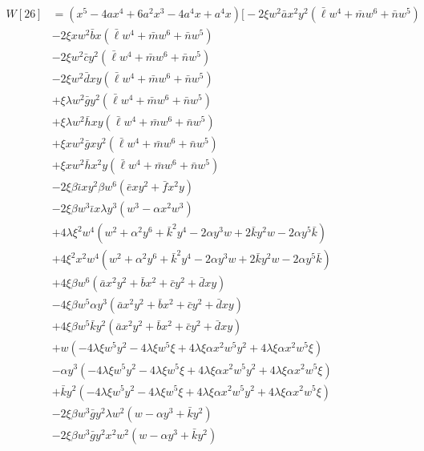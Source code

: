 \documentclass[12pt]{article}
\numberwithin{table}{section}
\begin{document}
\begin{align}
W[26] &= (x^5-4ax^4+6a^2x^3-4a^4x+a^4x)\biggl[-2\xi w^2\bar a x^2 y^2(\bar \ell  w^4 + \bar m  w^6 + \bar n  w^5) \\
&- 2\xi xw^2\bar b x(\bar \ell  w^4 + \bar m  w^6 + \bar n  w^5) \\
&- 2\xi w^2\bar c y^2 (\bar \ell  w^4 + \bar m  w^6 + \bar n  w^5)\\
&- 2\xi w^2\bar d xy (\bar \ell  w^4 + \bar m  w^6 + \bar n  w^5) \\
&+ \xi \lambda w^2\bar g y^2 (\bar \ell  w^4 + \bar m  w^6 + \bar n  w^5)\\
&+ \xi \lambda w^2\bar h x y(\bar \ell  w^4 + \bar m  w^6 + \bar n  w^5)\\
&+ \xi x w^2\bar g xy^2 (\bar \ell  w^4 + \bar m  w^6 + \bar n  w^5)
 \\
&+ \xi x w^2\bar h x^2 y(\bar \ell  w^4 + \bar m  w^6 + \bar n  w^5)\\
&-2\xi \beta \bar \iota x y^2\beta w^6 (\bar e xy^2 + \bar f x^2 y) \\
&- 2\xi \beta w^3 \bar \iota x \lambda y^3 (w^3 - \alpha x^2 w^3) \\
&+4\lambda\xi^2 w^4 (  w^2 + \alpha^2 y^6  + \bar k^2 y^4  - 2  \alpha y^3  w + 2 \bar k y^2 w - 2 \alpha y^5  \bar k) \\
&+4\xi^2 x^2w^4 (  w^2 + \alpha^2 y^6  + \bar k^2 y^4  - 2  \alpha y^3  w + 2 \bar k y^2 w - 2 \alpha y^5  \bar k)  \\
&+  4 \xi\beta w^6  (\bar a x^2 y^2 + \bar b x^2 + \bar c y^2 + \bar d xy ) \\
&- 4 \xi\beta w^5\alpha y^3 (\bar a x^2 y^2 + \bar b x^2 + \bar c y^2 + \bar d xy ) \\
&+ 4 \xi\beta w^5\bar k y^2 (\bar a x^2 y^2 + \bar b x^2 + \bar c y^2 + \bar d xy ) \\
&+  w (-4 \lambda \xi w^5 y^2  -4 \lambda \xi w^5 \xi  +4 \lambda \xi \alpha x^2 w^5 y^2  + 4 \lambda \xi \alpha x^2 w^5 \xi ) \\
&- \alpha y^3  (-4 \lambda \xi w^5 y^2  -4 \lambda \xi w^5 \xi  +4 \lambda \xi \alpha x^2 w^5 y^2  + 4 \lambda \xi \alpha x^2 w^5 \xi ) \\
&+ \bar k y^2  (-4 \lambda \xi w^5 y^2  -4 \lambda \xi w^5 \xi  +4 \lambda \xi \alpha x^2 w^5 y^2  + 4 \lambda \xi \alpha x^2 w^5 \xi ) \\
&-2 \xi\beta w^3 \bar g y^2\lambda w^2 (  w - \alpha y^3  + \bar k y^2 )   \\
&-2 \xi\beta w^3 \bar g y^2 x^2 w^2 (  w - \alpha y^3  + \bar k y^2 ) \\

\end{align}
\end{document}
